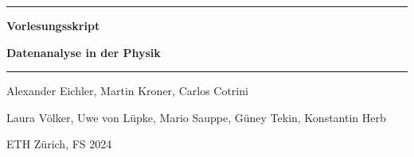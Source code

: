 \documentclass[a4paper, twoside, 11pt]{book}
\numberwithin{equation}{section} %
\numberwithin{table}{section}
\begin{document}
\hypersetup{pageanchor=false}
\begin{titlepage}
	
	
	\centering

	\hrule height 1.5pt
	\vspace{10pt}
	{\Large \bfseries Vorlesungsskript \par}
	\vspace{10pt}
	{\huge\bfseries Datenanalyse in der Physik  \par}
	\vspace{10pt}
	\hrule height 1.5pt
	
	
	\vspace{15mm}
	
	\begin{center}
		{\Large Alexander Eichler, Martin Kroner, Carlos Cotrini \par 
         \Large Laura V\"olker, Uwe von L\"upke, Mario Sauppe, G\"uney Tekin, Konstantin Herb\par }
		\vspace{15mm}
      
	
		
		
		\vfill
		{\large ETH Zürich, FS 2024\par}
	\end{center}
\end{titlepage}

\hypersetup{pageanchor=true}

\tableofcontents

\newpage
{}









\renewcommand*{\arraystretch}{1.2}%
\end{document}
